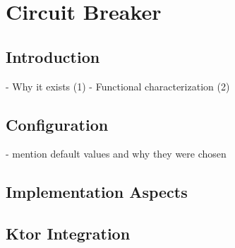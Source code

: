\chapter{Circuit Breaker}\label{ch:circuit-breaker}


\section{Introduction}\label{sec:cbreaker-introduction}

- Why it exists (1)
- Functional characterization (2)


\section{Configuration}\label{sec:cbreaker-configuration}

- mention default values and why they were chosen


\section{Implementation Aspects}\label{sec:cbreaker-implementation-aspects}


\section{Ktor Integration}\label{sec:cbreaker-ktor-integration}
